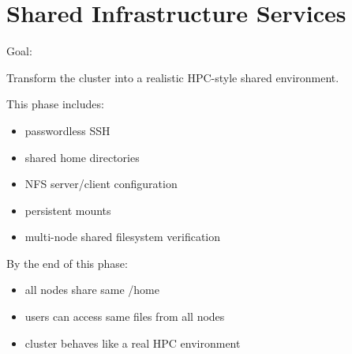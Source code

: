 \documentclass[11pt]{article}
\begin{document}
\section{Shared Infrastructure Services}
\label{sec:orgcd377b1}

Goal:

Transform the cluster into a realistic HPC-style shared environment.

This phase includes:

\begin{itemize}
\item passwordless SSH
\item shared home directories
\item NFS server/client configuration
\item persistent mounts
\item multi-node shared filesystem verification
\end{itemize}

By the end of this phase:

\begin{itemize}
\item all nodes share same /home
\item users can access same files from all nodes
\item cluster behaves like a real HPC environment
\end{itemize}
\end{document}
